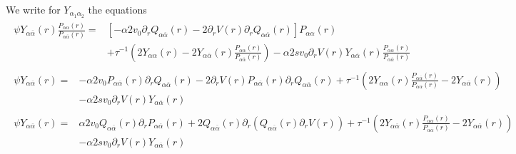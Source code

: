 \documentclass[pre,aps,superscriptaddress,nofootinbib]{revtex4}
\begin{document}
We write for $Y_{\alpha_1\alpha_2}$ the equations
\begin{eqnarray}
\label{FPrY1}
\begin{aligned}
\psi Y_{\alpha\overline{\alpha}}(r) \frac{P_{\alpha\alpha}(r)}{P_{\alpha\overline{\alpha}}(r)} = &\left[- \alpha 2 v_0 \partial_r Q_{\alpha\overline{\alpha}}(r) - 2 \partial_r V(r) \partial_r Q_{\alpha\overline{\alpha}}(r)\right] P_{\alpha\alpha}(r)\\
&+ \tau^{-1} \left(2 Y_{\alpha\alpha}(r) - 2 Y_{\alpha\overline{\alpha}}(r) \frac{P_{\alpha\alpha}(r)}{P_{\alpha\overline{\alpha}}(r)}\right) - \alpha 2 s v_0 \partial_r V(r) Y_{\alpha\overline{\alpha}}(r) \frac{P_{\alpha\alpha}(r)}{P_{\alpha\overline{\alpha}}(r)}
\end{aligned}\\
\label{FPrY3}
\begin{aligned}
\psi Y_{\alpha\overline{\alpha}}(r) = &- \alpha 2 v_0 P_{\alpha\overline{\alpha}}(r) \partial_r Q_{\alpha\overline{\alpha}}(r) - 2 \partial_r V(r) P_{\alpha\overline{\alpha}}(r) \partial_r Q_{\alpha\overline{\alpha}}(r) + \tau^{-1} \left(2 Y_{\alpha\alpha}(r) \frac{P_{\alpha\overline{\alpha}}(r)}{P_{\alpha\alpha}(r)} - 2 Y_{\alpha\overline{\alpha}}(r)\right)\\
&- \alpha 2 s v_0 \partial_r V(r) Y_{\alpha\overline{\alpha}}(r)
\end{aligned}\\
\label{FPrY4}
\begin{aligned}
\psi Y_{\alpha\overline{\alpha}}(r) = &\alpha 2 v_0 Q_{\alpha\overline{\alpha}}(r) \partial_r P_{\alpha\overline{\alpha}}(r) + 2 Q_{\alpha\overline{\alpha}}(r) \partial_r (Q_{\alpha\overline{\alpha}}(r) \partial_r V(r)) + \tau^{-1} \left(2 Y_{\alpha\overline{\alpha}}(r) \frac{P_{\alpha\alpha}(r)}{P_{\alpha\overline{\alpha}}(r)} - 2 Y_{\alpha\overline{\alpha}}(r)\right)\\
&- \alpha 2 s v_0 \partial_r V(r) Y_{\alpha\overline{\alpha}}(r)
\end{aligned}
\end{eqnarray}
\end{document}
